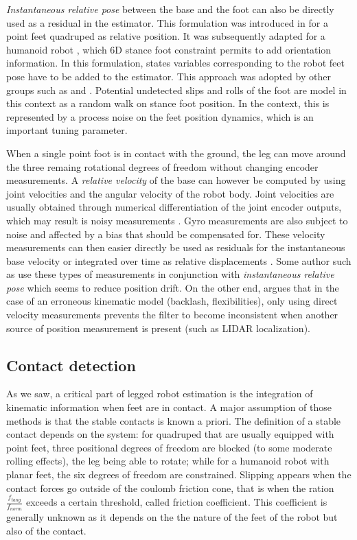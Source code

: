 \textit{Instantaneous relative pose} between the base and the foot can also be directly used as a residual in the estimator. This formulation
was introduced in \cite{bloesch2013state} for a point feet quadruped as relative position. It was subsequently adapted for a humanoid robot \cite{rotella2014state}, 
which 6D stance foot constraint permits to add orientation information. In this formulation, states variables corresponding to the robot feet pose have to 
be added to the estimator. This approach was adopted by other groups such as \cite{hartley2018legged, hartley2018hybrid, hartley2020contact} and \cite{bledt2018cheetah}.
Potential undetected slips and rolls of the foot are model in this context as a random walk on stance foot position. In the \KalmanF context, this is represented 
by a process noise on the feet position dynamics, which is an important tuning parameter.

When a single point foot is in contact with the ground, the leg can move around the three remaing rotational degrees of freedom without changing encoder measurements.
A \textit{relative velocity} of the base can however be computed by using joint velocities and the angular velocity of the robot body. 
Joint velocities are usually obtained through numerical differentiation of the joint encoder outputs, which may result is noisy measurements \cite{rotella2016imu}.
Gyro measurements are also subject to noise and affected by a bias that should be compensated for. These velocity measurements can then easier directly be used as
residuals for the instantaneous base velocity \cite{bloesch2013stateSlippery,bledt2018cheetah} or integrated over time as relative 
displacements \cite{ma2012robust, wisth2020preintegrated}. Some author such as \cite{bloesch2013stateSlippery, bledt2018cheetah} 
use these types of measurements in conjunction with \textit{instantaneous relative pose} which seems to reduce position drift. On the other end,
\cite{fallon2014drift} argues that in the case of an erroneous kinematic model (backlash, flexibilities), only using direct velocity measurements
prevents the filter to become inconsistent when another source of position measurement is present (such as LIDAR localization).  


\subsection{Contact detection}
As we saw, a critical part of legged robot estimation is the integration of kinematic information when feet are in contact. A major
assumption of those methods is that the stable contacts is known a priori. The definition of a stable contact depends on the system: for quadruped that 
are usually equipped with point feet, three positional degrees of freedom are blocked (to some moderate rolling effects), the leg being able to rotate; while for a humanoid robot with
planar feet, the six degrees of freedom are constrained. Slipping appears when the contact forces go outside of the coulomb friction cone, that is when the ration $\frac{f_{tang}}{f_{norm}}$
exceeds a certain threshold, called friction coefficient. This coefficient is generally unknown as it depends on the the nature of the feet of the robot but also of the contact.

